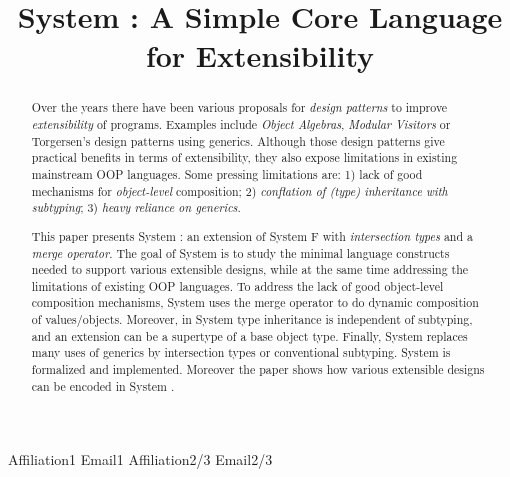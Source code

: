 \documentclass[nocopyrightspace,times,10pt]{sigplanconf}
\begin{document}
\setlength{\pdfpageheight}{\paperheight}
\setlength{\pdfpagewidth}{\paperwidth}


\preprintfooter{\name}                        %

\title{System \name: A Simple Core Language for Extensibility}

           {Affiliation1}
           {Email1}
           {Affiliation2/3}
           {Email2/3}

\maketitle

\begin{abstract}
  
  Over the years there have been various proposals for \emph{design
    patterns} to improve \emph{extensibility} of programs.
  Examples include \emph{Object Algebras}, \emph{Modular Visitors} or
  Torgersen's design patterns using generics.
  Although those design patterns give practical
  benefits in terms of extensibility, they also expose limitations in
  existing mainstream OOP languages. Some pressing
  limitations are: 1) lack of good mechanisms for
  \emph{object-level} composition; 2) \emph{conflation of 
    (type) inheritance with subtyping}; 3) \emph{heavy reliance on generics}.

  This paper presents System \name: an extension of System F with
  \emph{intersection types} and a \emph{merge operator}.  The goal of System \name
  is to study the minimal language constructs needed to support
  various extensible designs, while at the same time addressing the
  limitations of existing OOP languages. To address the lack of good
  object-level composition mechanisms, System \name uses the merge
  operator to do dynamic composition of values/objects. Moreover, in
  System \name type inheritance is independent of subtyping, and an
  extension can be a supertype of a base object type.  Finally, System
  \name replaces many uses of generics by intersection types or
  conventional subtyping. System \name is formalized and
  implemented. Moreover the paper shows how various extensible designs
  can be encoded in System \name.

\end{abstract}
\end{document}
